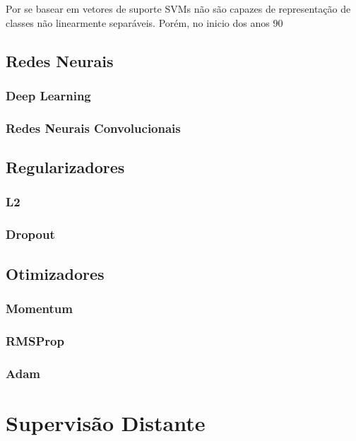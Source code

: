 
Por se basear em vetores de suporte SVMs não são capazes de representação de classes não linearmente separáveis. Porém, no inicio dos anos 90

\subsection{Redes Neurais}

\subsubsection{Deep Learning}

\subsubsection{Redes Neurais Convolucionais}

\subsection{Regularizadores}

\subsubsection{L2}

\subsubsection{Dropout}

\subsection{Otimizadores}

\subsubsection{Momentum}

\subsubsection{RMSProp}

\subsubsection{Adam}

\section{Supervisão Distante}

